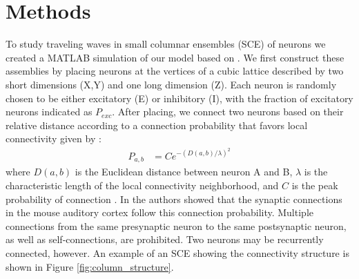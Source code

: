 \documentclass[12pt]{article}
\begin{document}
\section{Methods}
To study traveling waves in small columnar ensembles (SCE) of neurons we created a MATLAB simulation of our model based on \parencite{izhikevich2003} . 
We first construct these assemblies by placing neurons at the vertices of a cubic lattice described by two short  dimensions (X,Y) and one long dimension (Z). 
Each neuron is  randomly chosen to be  either excitatory (E) or inhibitory (I), with the fraction of excitatory neurons indicated as $P_{exc}$.
After placing, we connect two neurons based on their relative distance according to a connection probability that favors local connectivity given by  \parencite{maass2002}: 
\begin{align}\label{eq:connectivity}
 P_{a,b} &= C e^{-(D(a,b)/\lambda)^2}
\end{align}
where $D(a,b)$ is the Euclidean distance between neuron A and B, $\lambda$ is the characteristic length of the local connectivity neighborhood, and $C$ is the peak probability of connection .
In \parencite{Levy2012} the authors showed that the synaptic connections in the mouse auditory cortex follow this connection probability.
Multiple connections from the same presynaptic neuron to the same postsynaptic neuron, as well as self-connections, are prohibited.
Two neurons may be recurrently connected, however. 
An example of an SCE showing the connectivity structure is shown in Figure \ref{fig:column_structure}.
\end{document}
